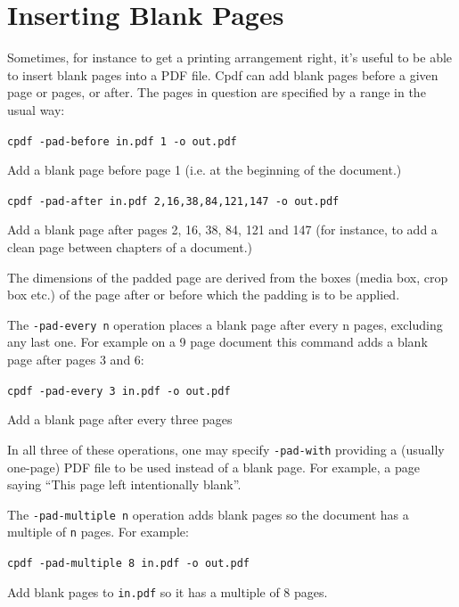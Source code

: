 \documentclass{book}
\begin{document}
  \section{Inserting Blank Pages}
  Sometimes, for instance to get a printing arrangement right, it's useful to
be able to insert blank pages into a PDF file. Cpdf can add blank pages
before a given page or pages, or after. The pages in question are specified by
a range in the usual way:

  \begin{framed}
    \noindent\small\verb!cpdf -pad-before in.pdf 1 -o out.pdf!
 
    \vspace{2.5mm}
    \noindent Add a blank page before page 1 (i.e. at the beginning of the document.)

    \vspace{2.5mm}
    \noindent\verb!cpdf -pad-after in.pdf 2,16,38,84,121,147 -o out.pdf!

    \vspace{2.5mm}
    \noindent Add a blank page after pages 2, 16, 38, 84, 121 and 147 (for
instance, to add a clean page between chapters of a document.)
  \end{framed}

  \noindent The dimensions of the padded page are derived from the boxes (media box, crop box etc.) of the page after or before which the padding is to be applied.

  The \verb!-pad-every n! operation places a blank page after every n pages, excluding any last one. For example on a 9 page document this command adds a blank page after pages 3 and 6:

  \begin{framed}
    \noindent\small\verb!cpdf -pad-every 3 in.pdf -o out.pdf!
 
    \vspace{2.5mm}
    \noindent Add a blank page after every three pages
  \end{framed}
  
\noindent In all three of these operations, one may specify \texttt{-pad-with} providing a (usually one-page)  PDF file to be used instead of a blank page. For example, a page saying ``This page left intentionally blank''.

  The \verb!-pad-multiple n! operation adds blank pages so the document has a multiple of \verb!n! pages. For example:

  \begin{framed}
    \noindent\small\verb!cpdf -pad-multiple 8 in.pdf -o out.pdf!
 
    \vspace{2.5mm}
    \noindent Add blank pages to \texttt{in.pdf} so it has a multiple of 8 pages. 
  \end{framed}
 
\end{document}
